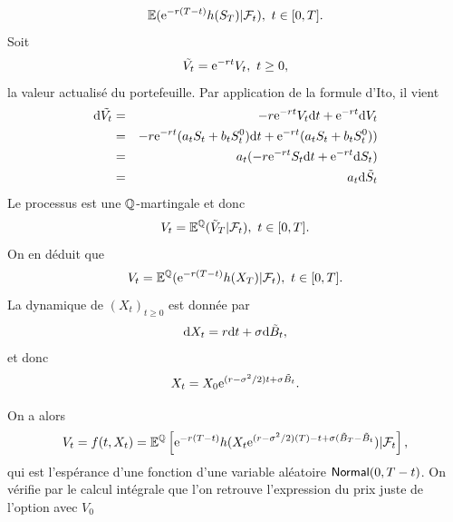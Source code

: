 $$
\mathbb{E}(\mathrm{e}^{-r(T-t)}h(S_T)|\mathcal{F}_t),\text{ }t\in [0,T].
$$
Soit 
$$
\tilde{V_t} = \mathrm{e}^{-rt}V_t,\text{ }t\geq 0,
$$
la valeur actualisé du portefeuille. Par application de la formule d'Ito, il vient 
\begin{eqnarray*}
\text{d}\tilde{V_t}  &=& -r\mathrm{e}^{-rt}V_t\text{d}t + \mathrm{e}^{-rt}\text{d}V_t\\
 &=&-r\mathrm{e}^{-rt}(a_t S_t + b_tS_t^0)\text{d}t + \mathrm{e}^{-rt}(a_t S_t + b_tS_t^0 ))\\
 &=&a_t(-r\mathrm{e}^{-rt}S_t\text{d}t + \mathrm{e}^{-rt}\text{d}S_t)\\
 &=&a_t\text{d}\tilde{S}_t
\end{eqnarray*}
Le processus est une $\mathbb{Q}$-martingale et donc 
$$
V_t = \mathbb{E}^{\mathbb{Q}}(\tilde{V}_T|\mathcal{F}_t),\text{ }t\in [0,T].
$$
On en déduit que 
$$
V_t = \mathbb{E}^{\mathbb{Q}}(\mathrm{e}^{-r(T-t)}h(X_T)|\mathcal{F}_t),\text{ }t\in [0,T].
$$
La dynamique de $(X_t)_{t\geq 0}$ est donnée par 
$$
\text{d} X_t = r \text{d} t + \sigma\text{d}  \tilde{B}_t,
$$
et donc 
$$
X_t = X_0 \mathrm{e}^{(r-\sigma^2 / 2)t + \sigma \tilde{B}_t }.
$$

On a alors 
$$
V_t = f(t, X_t) = \mathbb{E}^{\mathbb{Q}}\left[\mathrm{e}^{-r(T-t)}h(X_t\mathrm{e}^{(r-\sigma^2 / 2)(T)-t + \sigma (\tilde{B}_T - \tilde{B}_t})|\mathcal{F}_t\right],
$$
qui est l'espérance d'une fonction d'une variable aléatoire $\mathsf{Normal}(0,T-t)$. On vérifie par le calcul intégrale que l'on retrouve l'expression du prix juste de l'option avec $V_0$





\newpage